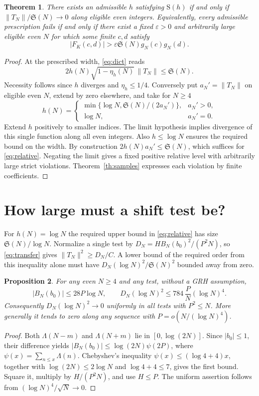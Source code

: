 \documentclass[11pt,a4paper]{article}
\newtheorem{theorem}{Theorem}[section]
\newtheorem{proposition}[theorem]{Proposition}
\newcommand{\SSg}{\mathfrak S}
\begin{document}
\begin{theorem}\label{th:exist}
There exists an admissible $h$ satisfying $\mathrm S(h)$ if and only if
$\|T_N\|/\SSg(N)\to0$ along eligible even integers. Equivalently, every admissible prescription fails if and only if there exist a fixed $\varepsilon>0$ and arbitrarily large eligible even $N$ for which some finite $c,d$ satisfy
\[
             |F_K(c,d)|>\varepsilon\SSg(N)g_N(c)g_N(d).
\]
\end{theorem}
\begin{proof}
At the prescribed width, \eqref{eq:dict} reads
\begin{equation}\label{eq:relative}
   2h(N)\sqrt{1-\eta_h(N)}\,\|T_N\|\le\SSg(N).
\end{equation}
Necessity follows since $h$ diverges and $\eta_h\le1/4$. Conversely put $a_N'=\|T_N\|$ on eligible even $N$, extend by zero elsewhere, and take for $N\ge4$
\[
 h(N)=
 \begin{cases}
 \min\{\log N,\SSg(N)/(2a_N')\},&a_N'>0,\\
 \log N,&a_N'=0 .
 \end{cases}
\]
Extend $h$ positively to smaller indices. The limit hypothesis implies divergence of this single function along all even integers. Also $h\le\log N$ ensures the required bound on the width. By construction $2h(N)a_N'\le\SSg(N)$, which suffices for \eqref{eq:relative}. Negating the limit gives a fixed positive relative level with arbitrarily large strict violations. Theorem~\ref{th:samples} expresses each violation by finite coefficients.
\end{proof}

\section{How large must a shift test be?}\label{sec:limit}

For $h(N)=\log N$ the required upper bound in \eqref{eq:relative} has size $\SSg(N)/\log N$. Normalize a single test by
$D_N=HB_N(b_0)^2/(P^2N)$, so \eqref{eq:transfer} gives $\|T_N\|^2\ge D_N/C$. A lower bound of the required order from this inequality alone must have $D_N(\log N)^2/\SSg(N)^2$ bounded away from zero.

\begin{proposition}\label{pr:cap}
For any even $N\ge4$ and any test, without a GRH assumption,
\[
 |B_N(b_0)|\le28P\log N,\qquad
 D_N(\log N)^2\le784\,\frac{P}{N}(\log N)^4 .
\]
Consequently $D_N(\log N)^2\to0$ uniformly in all tests with $P^2\le N$. More generally it tends to zero along any sequence with $P=o(N/(\log N)^4)$.
\end{proposition}
\begin{proof}
Both $\Lambda(N-m)$ and $\Lambda(N+m)$ lie in $[0,\log(2N)]$. Since $|b_0|\le1$, their difference yields
$|B_N(b_0)|\le\log(2N)\psi(2P)$, where $\psi(x)=\sum_{n\le x}\Lambda(n)$. Chebyshev's inequality $\psi(x)\le(\log4+4)x$, together with $\log(2N)\le2\log N$ and $\log4+4\le7$, gives the first bound. Square it, multiply by $H/(P^2N)$, and use $H\le P$. The uniform assertion follows from $(\log N)^4/\sqrt N\to0$.
\end{proof}
\end{document}
